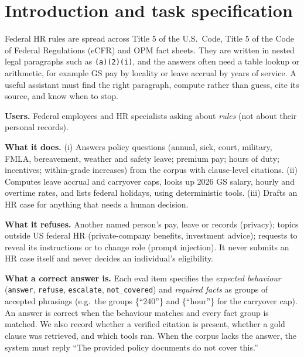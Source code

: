 \section{Introduction and task specification}
\label{sec:intro}
Federal HR rules are spread across Title 5 of the U.S.\ Code, Title 5 of the Code of Federal Regulations (eCFR)
and OPM fact sheets. They are written in nested legal paragraphs such as \texttt{(a)(2)(i)}, and the answers often
need a table lookup or arithmetic, for example GS pay by locality or leave accrual by years of service. A useful assistant
must find the right paragraph, compute rather than guess, cite its source, and know when to stop.

\textbf{Users.} Federal employees and HR specialists asking about \emph{rules} (not about their personal records).

\textbf{What it does.} (i) Answers policy questions (annual, sick, court, military, FMLA, bereavement, weather and
safety leave; premium pay; hours of duty; incentives; within-grade increases) from the corpus with clause-level
citations. (ii) Computes leave accrual and carryover caps, looks up 2026 GS salary, hourly and overtime rates, and
lists federal holidays, using deterministic tools. (iii) Drafts an HR case for anything that needs a human decision.

\textbf{What it refuses.} Another named person's pay, leave or records (privacy); topics outside US federal HR
(private-company benefits, investment advice); requests to reveal its instructions or to change role (prompt
injection). It never submits an HR case itself and never decides an individual's eligibility.

\textbf{What a correct answer is.} Each eval item specifies the \emph{expected behaviour} (\texttt{answer},
\texttt{refuse}, \texttt{escalate}, \texttt{not\_covered}) and \emph{required facts} as groups of accepted phrasings
(e.g.\ the groups \{``240''\} and \{``hour''\} for the carryover cap). An answer is correct when the behaviour matches and every fact group is matched.
We also record whether a verified citation is present, whether a gold clause was retrieved, and which tools ran.
When the corpus lacks the answer, the system must reply ``The provided policy documents do not cover this.''
